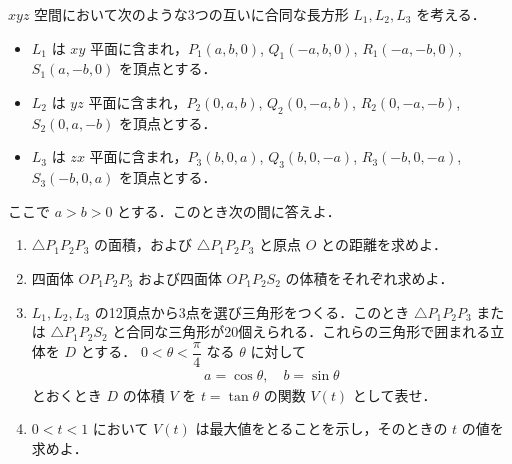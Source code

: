 \documentclass[../../main.tex]{subfiles}
\begin{document}
$xyz$ 空間において次のような3つの互いに合同な長方形 $L_1, L_2, L_3$ を考える．
\begin{itemize}
  \item $L_1$ は $xy$ 平面に含まれ，$P_1(a, b, 0)$, $Q_1(-a, b, 0)$, $R_1(-a, -b, 0)$, $S_1(a, -b, 0)$ を頂点とする．
  \item $L_2$ は $yz$ 平面に含まれ，$P_2(0, a, b)$, $Q_2(0, -a, b)$, $R_2(0, -a, -b)$, $S_2(0, a, -b)$ を頂点とする．
  \item $L_3$ は $zx$ 平面に含まれ，$P_3(b, 0, a)$, $Q_3(b, 0, -a)$, $R_3(-b, 0, -a)$, $S_3(-b, 0, a)$ を頂点とする．
\end{itemize}
ここで $a > b > 0$ とする．このとき次の間に答えよ．

\begin{enumerate}
  \item $\triangle P_1 P_2 P_3$ の面積，および $\triangle P_1 P_2 P_3$ と原点 $O$ との距離を求めよ．
  \item 四面体 $O P_1 P_2 P_3$ および四面体 $O P_1 P_2 S_2$ の体積をそれぞれ求めよ．
  \item $L_1, L_2, L_3$ の12頂点から3点を選び三角形をつくる．このとき $\triangle P_1 P_2 P_3$ または $\triangle P_1 P_2 S_2$ と合同な三角形が20個えられる．これらの三角形で囲まれる立体を $D$ とする． $0 < \theta < \dfrac{\pi}{4}$ なる $\theta$ に対して
    \begin{align}
      a = \cos \theta, \quad b = \sin \theta
    \end{align}
    とおくとき $D$ の体積 $V$ を $t = \tan \theta$ の関数 $V(t)$ として表せ．
  \item $0 < t < 1$ において $V(t)$ は最大値をとることを示し，そのときの $t$ の値を求めよ．
\end{enumerate}

\begin{figure}[H]
  \centering
\end{figure}
\end{document}
